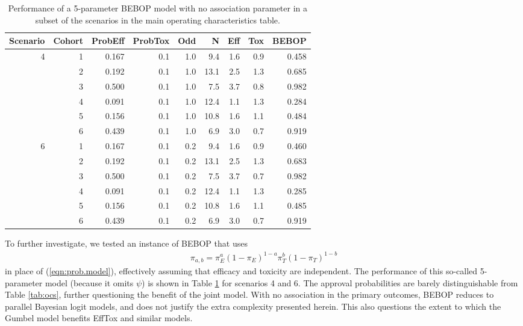 \documentclass[alpha-refs]{wiley-article}
\begin{document}
\begin{table}[ht]
\centering
\begin{tabular}{rrrrrrrrr}
  \hline
Scenario & Cohort & ProbEff & ProbTox & Odd & N & Eff & Tox & BEBOP \\ 
  \hline
4 & 1 & 0.167 & 0.1 & 1.0 & 9.4 & 1.6 & 0.9 & 0.458 \\ 
   & 2 & 0.192 & 0.1 & 1.0 & 13.1 & 2.5 & 1.3 & 0.685 \\ 
   & 3 & 0.500 & 0.1 & 1.0 & 7.5 & 3.7 & 0.8 & 0.982 \\ 
   & 4 & 0.091 & 0.1 & 1.0 & 12.4 & 1.1 & 1.3 & 0.284 \\ 
   & 5 & 0.156 & 0.1 & 1.0 & 10.8 & 1.6 & 1.1 & 0.484 \\ 
   & 6 & 0.439 & 0.1 & 1.0 & 6.9 & 3.0 & 0.7 & 0.919 \\ 
   \hline
6 & 1 & 0.167 & 0.1 & 0.2 & 9.4 & 1.6 & 0.9 & 0.460 \\ 
   & 2 & 0.192 & 0.1 & 0.2 & 13.1 & 2.5 & 1.3 & 0.683 \\ 
   & 3 & 0.500 & 0.1 & 0.2 & 7.5 & 3.7 & 0.7 & 0.982 \\ 
   & 4 & 0.091 & 0.1 & 0.2 & 12.4 & 1.1 & 1.3 & 0.285 \\ 
   & 5 & 0.156 & 0.1 & 0.2 & 10.8 & 1.6 & 1.1 & 0.485 \\ 
   & 6 & 0.439 & 0.1 & 0.2 & 6.9 & 3.0 & 0.7 & 0.919 \\ 
   \hline
\end{tabular}
\caption{Performance of a 5-parameter BEBOP model with no association parameter in a subset of the scenarios in the main operating characteristics table.} 
\label{tab:5param_ocs}
\end{table}

To further investigate, we tested an instance of BEBOP that uses 
\begin{gather}
\label{eqn:bebop.joint.nocorrel}
\pi_{a,b} = \pi_E^a (1-\pi_E)^{1-a} \pi_T^b (1-\pi_T)^{1-b}
\end{gather}
in place of (\ref{eqn:prob.model}), effectively assuming that efficacy and toxicity are independent.
The performance of this so-called 5-parameter model (because it omits $\psi$) is shown in Table \ref{tab:5param_ocs} for scenarios 4 and 6.
The approval probabilities are barely distinguishable from Table \ref{tab:ocs}, further questioning the benefit of the joint model.
With no association in the primary outcomes, BEBOP reduces to parallel Bayesian logit models, and does not justify the extra complexity presented herein.
This also questions the extent to which the Gumbel model benefits EffTox\citep{Thall2004} and similar models.
\end{document}
